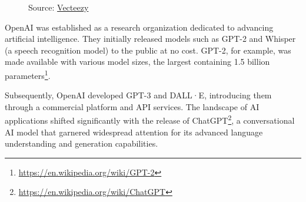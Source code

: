 \begin{figure}
  \centering
  \def\stackalignment{r}
  {\scriptsize \parbox[t]{\linewidth}{Source: \href{https://www.vecteezy.com/png/22227364-openai-chatgpt-logo-icon}{Vecteezy}}}
\end{figure}

OpenAI was established as a research organization dedicated to advancing artificial
intelligence. They initially released models such as GPT-2\cite{Radford2019LanguageMA}
and Whisper\cite{radford2022robustspeechrecognitionlargescale} (a speech recognition
model) to the public at no cost. GPT-2, for example, was made available with various
model sizes, the largest containing 1.5 billion parameters\footnote{\url{https://en.wikipedia.org/wiki/GPT-2}}.

Subsequently, OpenAI developed GPT-3 and DALL·E\cite{ramesh2021zeroshottexttoimagegeneration},
introducing them through a commercial platform and API services. The landscape of
AI applications shifted significantly with the release of ChatGPT\footnote{\url{https://en.wikipedia.org/wiki/ChatGPT}},
a conversational AI model that garnered widespread attention for its advanced language
understanding and generation capabilities.

